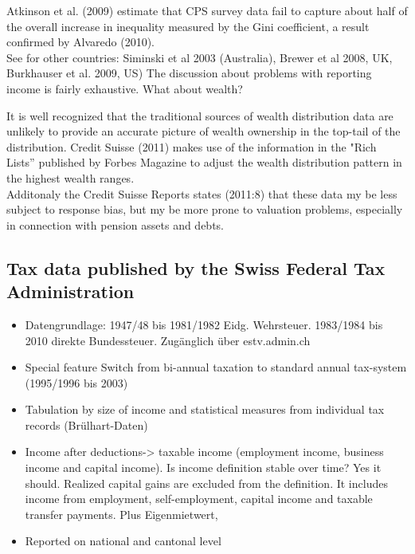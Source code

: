 Atkinson et al. (2009) estimate that CPS survey data fail to capture about half of the overall increase in inequality measured by the Gini coefficient, a result confirmed by Alvaredo (2010). \\

See for other countries: Siminski et al 2003 (Australia), Brewer et al 2008, UK, Burkhauser et al. 2009, US)
The discussion about problems with reporting income is fairly exhaustive. What about wealth?

It is well recognized that the traditional sources of wealth distribution data are unlikely to provide an accurate picture of wealth ownership in the top-tail of the distribution. Credit Suisse (2011) makes use of the information in the "Rich Lists'' published by Forbes Magazine to adjust the wealth distribution pattern in the highest wealth ranges. \\

Additonaly the Credit Suisse Reports states (2011:8) that these data my be less subject to response bias, but my be more prone to valuation problems, especially in connection with pension assets and debts.

\subsection{Tax data published by the Swiss Federal Tax Administration}

\begin{itemize}
\item	Datengrundlage: 1947/48 bis 1981/1982 Eidg. Wehrsteuer. 1983/1984 bis 2010 direkte Bundessteuer. Zugänglich über estv.admin.ch
	\item	Special feature Switch from bi-annual taxation to standard annual tax-system (1995/1996 bis 2003)
	\item	Tabulation by size of income and statistical measures from individual tax records (Brülhart-Daten)
	\item	Income after deductions-> taxable income (employment income, business income and capital income). Is income definition stable over time? Yes it should. Realized capital gains are excluded from the definition. It includes income from  employment, self-employment, capital income and taxable transfer payments. Plus Eigenmietwert, 
	\item	Reported on national and cantonal level
\end{itemize}

